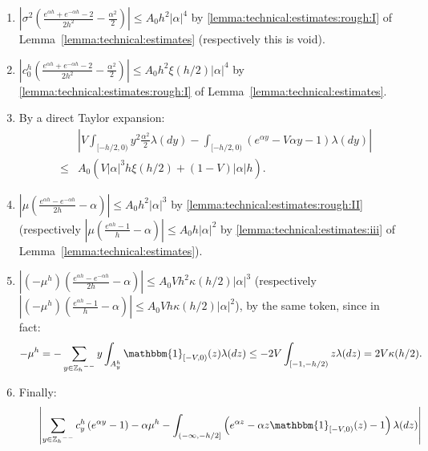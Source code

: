 \documentclass[pdftex,oneside,11pt,reqno]{amsart}
\theoremstyle{definition}
\theoremstyle{theorem}
\theoremstyle{remark}
\numberwithin{equation}{section}
\numberwithin{definition}{section}
\begin{document}
\begin{enumerate}[(1)]
\item\label{item:diffusion>0:first} $\left\vert {\sigma^2}\left(\frac{e^{\alpha h}+e^{-\alpha h}-2}{2h^2}-\frac{\alpha^2}{2}\right)\right\vert\leq A_0h^2\vert \alpha\vert^4$ by \ref{lemma:technical:estimates:rough:I}  of Lemma~\ref{lemma:technical:estimates} (respectively this is void).
\item\label{item:diffusion>0:2}  $\left\vert c_0^h\left(\frac{e^{\alpha h}+e^{-\alpha h}-2}{2h^2}-\frac{\alpha^2}{2}\right)\right\vert\leq A_0h^2\xi(h/2)\vert\alpha\vert^4$ by \ref{lemma:technical:estimates:rough:I}  of Lemma~\ref{lemma:technical:estimates}. 
\item\label{item:diffusion>0:3} By a direct Taylor expansion:
\begin{eqnarray*}
&\phantom{\leq}&\left\vert V\int_{[-h/2,0)}y^2\frac{\alpha^2}{2}{\lambda}(dy)-\int_{[-h/2,0)}\left(e^{\alpha y}-V\alpha y-1\right){\lambda}(dy)\right\vert\\
&\leq& A_0\left(V\vert \alpha\vert^3h\xi(h/2)+(1-V)\vert \alpha\vert h\right).
\end{eqnarray*} 
\item\label{item:diffusion>0:4} $\left\vert \mu\left(\frac{e^{\alpha h}-e^{-\alpha h}}{2h}-\alpha\right)\right\vert\leq A_0h^2\vert \alpha\vert^3$ by \ref{lemma:technical:estimates:rough:II} (respectively $\left\vert \mu\left(\frac{e^{\alpha h}-1}{h}-\alpha\right)\right\vert\leq A_0h\vert \alpha\vert^2$ by \ref{lemma:technical:estimates:iii} of Lemma~\ref{lemma:technical:estimates}).
\item\label{item:diffusion>0:5} $\left\vert \left(-\mu^h\right)\left(\frac{e^{\alpha h}-e^{-\alpha h}}{2h}-\alpha\right)\right\vert\leq A_0Vh^2\kappa(h/2)\vert \alpha\vert^3$ (respectively $\left\vert \left(-\mu^h\right)\left(\frac{e^{\alpha h}-1}{h}-\alpha\right)\right\vert\leq  A_0Vh\kappa(h/2)\vert \alpha\vert^2$), by the same token, since in fact:
\begin{equation*}
-\mu^h =- \sum_{y\in{\mathbb{Z}_h}^{--}}y\int_{A_y^h}{\mathbbm{1}_{[-V,0)}}(z){\lambda}(dz)\leq -2V\int_{[-1,-h/2)}z{\lambda}(dz)= 2V\kappa(h/2).
\end{equation*}
\item\label{item:diffusion>0:last} Finally: 
\begin{eqnarray*}
&\phantom{\leq}&\left\vert\sum_{y\in{\mathbb{Z}_h}^{--}}c_y^h\left(e^{ \alpha y}-1\right)-\alpha \mu^h-\int_{(-\infty,-h/2]}\left(e^{\alpha z}-\alpha z{\mathbbm{1}_{[-V,0)}}(z)-1\right){\lambda}(dz)\right\vert\\

\end{eqnarray*}
\end{enumerate}
\end{document}
